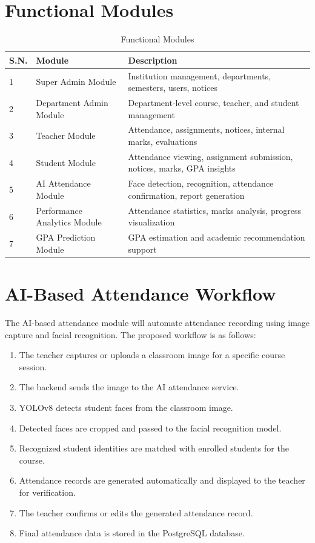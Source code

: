 \documentclass[12pt,a4paper,oneside]{report}
\let\oldsection\section
\renewcommand{\section}{\clearpage\oldsection}
\begin{document}
\section{Functional Modules}
\begin{longtable}{|p{}|p{}|p{}|}
\caption{Functional Modules}\\
\hline
\textbf{S.N.} & \textbf{Module} & \textbf{Description} \\ \hline
1 & Super Admin Module & Institution management, departments, semesters, users, notices \\ \hline
2 & Department Admin Module & Department-level course, teacher, and student management \\ \hline
3 & Teacher Module & Attendance, assignments, notices, internal marks, evaluations \\ \hline
4 & Student Module & Attendance viewing, assignment submission, notices, marks, GPA insights \\ \hline
5 & AI Attendance Module & Face detection, recognition, attendance confirmation, report generation \\ \hline
6 & Performance Analytics Module & Attendance statistics, marks analysis, progress visualization \\ \hline
7 & GPA Prediction Module & GPA estimation and academic recommendation support \\ \hline
\end{longtable}

\section{AI-Based Attendance Workflow}
The AI-based attendance module will automate attendance recording using image capture and facial recognition. The proposed workflow is as follows:
\begin{enumerate}
\item The teacher captures or uploads a classroom image for a specific course session.
\item The backend sends the image to the AI attendance service.
\item YOLOv8 detects student faces from the classroom image.
\item Detected faces are cropped and passed to the facial recognition model.
\item Recognized student identities are matched with enrolled students for the course.
\item Attendance records are generated automatically and displayed to the teacher for verification.
\item The teacher confirms or edits the generated attendance record.
\item Final attendance data is stored in the PostgreSQL database.
\end{enumerate}
\end{document}
